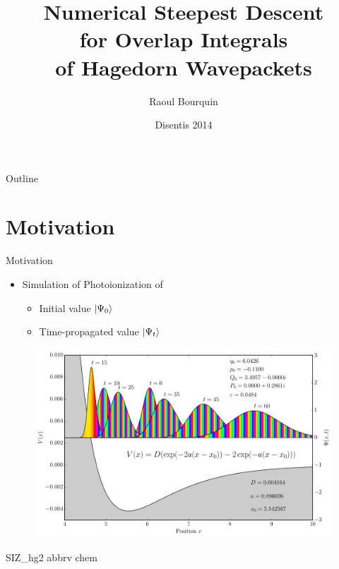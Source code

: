 \documentclass{beamer}
\title[Numerical Steepest Descent for Hagedorn Wavepackets]
      {Numerical Steepest Descent \\
       for Overlap Integrals \\
       of Hagedorn Wavepackets}
\author[]{Raoul Bourquin}
\date{Disentis 2014}
\begin{document}
\begin{frame}
  \titlepage
\end{frame}

\begin{frame}{Outline}
  \tableofcontents
\end{frame}


\section{Motivation}
\begin{frame}{Motivation}
  \begin{itemize}
    \item Simulation of Photoionization of 
    \begin{itemize}
      \item Initial value $\ket{\Psi_0}$
      \item Time-propagated value $\ket{\Psi_t}$
    \end{itemize}
  \end{itemize}
  \begin{figure}
    \centering
    \includegraphics[width=0.6\linewidth]{./fig/hg_morse_wps.pdf}
  \end{figure}
  \nocite{chem}{SIZ_hg2}
  \tiny
  {abbrv}
  {chem}{}
\end{frame}
\end{document}

